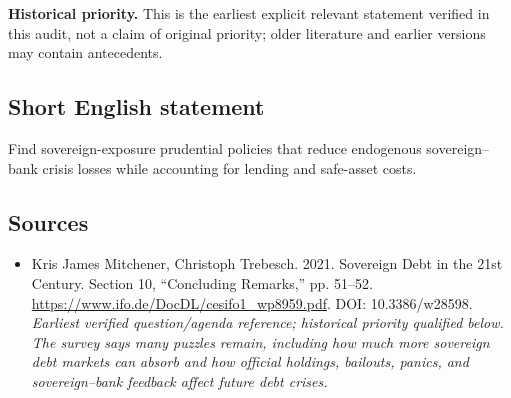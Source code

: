 \documentclass[11pt]{article}
\begin{document}
\par\textbf{Historical priority.} This is the earliest explicit relevant statement verified in this audit, not a claim of original priority; older literature and earlier versions may contain antecedents.

\subsection{Short English statement}
Find sovereign-exposure prudential policies that reduce endogenous sovereign–bank crisis losses while accounting for lending and safe-asset costs.

\subsection{Sources}
\begin{itemize}\raggedright
\item[\textnormal{[S1]}]\hypertarget{source:30007536:1}{} Kris James Mitchener, Christoph Trebesch. 2021. Sovereign Debt in the 21st Century. Section 10, “Concluding Remarks,” pp. 51–52.
\url{https://www.ifo.de/DocDL/cesifo1_wp8959.pdf}.
DOI: 10.3386/w28598.
{\small\textit{Earliest verified question/agenda reference; historical priority qualified below. The survey says many puzzles remain, including how much more sovereign debt markets can absorb and how official holdings, bailouts, panics, and sovereign–bank feedback affect future debt crises.}}
\end{itemize}
\end{document}
